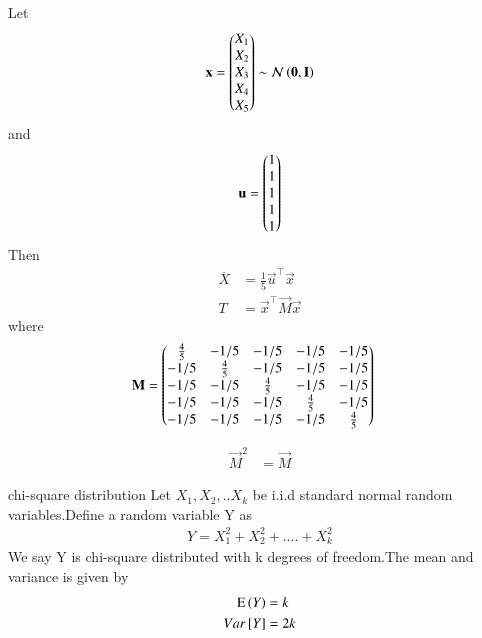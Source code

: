 \begin{lemma}
Let 
\begin{align}
    \mathbf{x}=\begin{pmatrix}X_1\\
             X_2\\
             X_3\\
             X_4\\
             X_5\end{pmatrix}
             \sim \mathcal{N}\left({\mathbf{0}}, {\mathbf{I}} \right)
\end{align}
and 
\begin{align}
    \mathbf{u}=\begin{pmatrix}1\\
                      1\\
                      1\\
                      1\\
                      1\end{pmatrix}
\end{align} 
%
Then 
\begin{align}
    \overline{X}&=\frac{1}{5}\vec{u}^{\top}\vec{x}
    \\
   T&=\vec{x}^{\top}\vec{M}\vec{x}
\end{align}
where
\begin{align}
    \mathbf{M}&=\begin{pmatrix}\frac{4}{5}&-1/5&-1/5&-1/5&-1/5\\
                   -1/5&\frac{4}{5}&-1/5&-1/5&-1/5\\
                   -1/5&-1/5&\frac{4}{5}&-1/5&-1/5\\
                   -1/5&-1/5&-1/5&\frac{4}{5}&-1/5\\
                   -1/5&-1/5&-1/5&-1/5&\frac{4}{5}\end{pmatrix}
\end{align}
\end{lemma}
%
\begin{lemma}
\begin{align}
    \vec{M}^2&=\vec{M}
\end{align}
\end{lemma}
\begin{definition}{chi-square distribution}
 Let $X_1,X_2,..X_k$ be i.i.d  standard normal random variables.Define a random variable Y as
 \begin{align}
     Y=X_1^2+X_2^2+....+X_k^2
 \end{align}
 We say Y is chi-square distributed with k degrees of freedom.The mean and variance is given by
 \begin{align}
   \text{E}\left( Y \right)&=k\\
   Var{}\left[Y\right]&=2k
 \end{align}
 
\end{definition}
